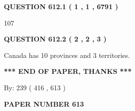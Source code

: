 \documentclass[12pt]{article}
\begin{document}
   
   
   
 \vspace{0.2in}
 
 
 
 
   
   
  
\vspace{0.2in}
  
{\textbf{\Large{QUESTION
612.1 
 ( 1 , 1 , 6791 )
}}}
  
  
 
 
\noindent{}

107
 
 
  
\vspace{0.2in}
  
{\textbf{\Large{QUESTION
612.2 
 ( 2 , 2 , 3 )
}}}
  
  
 
 
\noindent{}
 
 
Canada has 10  provinces and 3 territories.
 
 
 
 
   
   
 \vspace{0.2in}
 
   
   
   
   
\vspace{1.0in} 
{\textbf{\large{ *** END OF PAPER, THANKS *** }}} 
   
   
\hspace{1.0in} By: 
 239 ( 416 ,  613 )
   
   
   
   
\newpage 
\setcounter{page}{ 
   613001 } 
   
   
   
   
 {\textbf{ \Large{ PAPER NUMBER  613  }}}
   
   
\vspace{0.2in}
   
   
   
   
   
   
 \vspace{0.2in}
 
 
 
 
   
\end{document}
